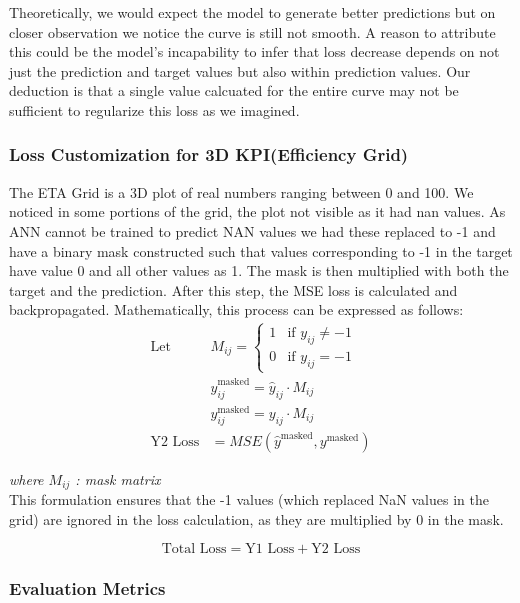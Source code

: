 \documentclass{report} %
\begin{document}
Theoretically, we would expect the model to generate better predictions but on closer observation we notice the curve is still not smooth.
A reason to attribute this could be the model's incapability to infer that loss decrease depends on not just the prediction and target values but also within prediction values.
Our deduction is that a single value calcuated for the entire curve may not be sufficient to regularize this loss as we imagined.

\subsubsection*{Loss Customization for 3D KPI(Efficiency Grid)}
The ETA Grid is a 3D plot of real numbers ranging between 0 and 100. We noticed in some portions of the grid, the plot not visible as it had nan values.
As ANN cannot be trained to predict NAN values we had these replaced to -1 and have a binary mask constructed such that values corresponding to -1 in the target have value 0 and all other values as 1.
The mask is then multiplied with both the target and the prediction. After this step, the MSE loss is calculated and backpropagated.
Mathematically, this process can be expressed as follows:
\begin{equation*}
\begin{aligned}
\text{Let } & M_{ij} = \begin{cases}
1 & \text{if } y_{ij} \neq -1 \\
0 & \text{if } y_{ij} = -1
\end{cases} \\
& \hat{y}_{ij}^{\text{masked}} = \hat{y}_{ij} \cdot M_{ij} \\
& y_{ij}^{\text{masked}} = y_{ij} \cdot M_{ij} \\
\text{{Y2 Loss}} & = MSE(\hat{y}^{\text{masked}}, y^{\text{masked}})
\end{aligned}
\end{equation*}

\textit{where
 $M_{ij}$ : mask matrix}
 \\

This formulation ensures that the -1 values (which replaced NaN values in the grid) are ignored in the loss calculation, as they are multiplied by 0 in the mask.

\[
\text{Total Loss} = \text{Y1 Loss} + \text{Y2 Loss}
\]

\subsubsection*{Evaluation Metrics}
\end{document}
